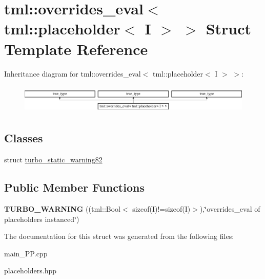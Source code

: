 \hypertarget{structtml_1_1overrides__eval_3_01tml_1_1placeholder_3_01I_01_4_01_4}{\section{tml\+:\+:overrides\+\_\+eval$<$ tml\+:\+:placeholder$<$ I $>$ $>$ Struct Template Reference}
\label{structtml_1_1overrides__eval_3_01tml_1_1placeholder_3_01I_01_4_01_4}
}
Inheritance diagram for tml\+:\+:overrides\+\_\+eval$<$ tml\+:\+:placeholder$<$ I $>$ $>$\+:\begin{figure}[H]
\begin{center}
\leavevmode
\includegraphics[height=1.408805cm]{structtml_1_1overrides__eval_3_01tml_1_1placeholder_3_01I_01_4_01_4}
\end{center}
\end{figure}
\subsection*{Classes}
\begin{DoxyCompactItemize}
\item 
struct \hyperlink{structtml_1_1overrides__eval_3_01tml_1_1placeholder_3_01I_01_4_01_4_1_1turbo__static__warning82}{turbo\+\_\+static\+\_\+warning82}
\end{DoxyCompactItemize}
\subsection*{Public Member Functions}
\begin{DoxyCompactItemize}
\item 
\hypertarget{structtml_1_1overrides__eval_3_01tml_1_1placeholder_3_01I_01_4_01_4_a7631e211b31e6defc645bbe872878812}{{\bfseries T\+U\+R\+B\+O\+\_\+\+W\+A\+R\+N\+I\+N\+G} ((tml\+::\+Bool$<$ sizeof(I)!=sizeof(I)$>$),\char`\"{}overrides\+\_\+eval of placeholders instanced\char`\"{})}\label{structtml_1_1overrides__eval_3_01tml_1_1placeholder_3_01I_01_4_01_4_a7631e211b31e6defc645bbe872878812}

\end{DoxyCompactItemize}


The documentation for this struct was generated from the following files\+:\begin{DoxyCompactItemize}
\item 
main\+\_\+\+P\+P.\+cpp\item 
placeholders.\+hpp\end{DoxyCompactItemize}
